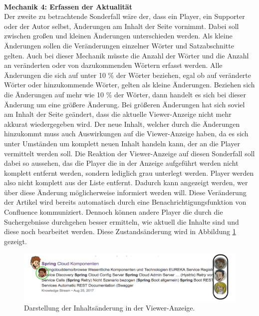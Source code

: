 \documentclass[a4paper,12pt,twoside]{scrartcl}
\begin{document}
\\
\textbf{Mechanik 4: Erfassen der Aktualität}\\
Der zweite zu betrachtende Sonderfall wäre der, dass ein Player, ein Supporter oder der Autor selbst, Änderungen am Inhalt der Seite vornimmt. Dabei soll zwischen großen und kleinen Änderungen unterschieden werden. Als kleine Änderungen sollen die Veränderungen einzelner Wörter und Satzabschnitte gelten. Auch bei dieser Mechanik müsste die Anzahl der Wörter und die Anzahl an veränderten oder von dazukommenden Wörtern erfasst werden.  Alle Änderungen die sich auf unter 10 \% der Wörter beziehen, egal ob auf veränderte Wörter oder hinzukommende Wörter, gelten als kleine Änderungen. Beziehen sich die Änderungen auf mehr wie  10 \% der Wörter, dann handelt es sich bei dieser Änderung um eine größere Änderung. Bei größeren Änderungen hat sich soviel am Inhalt der Seite geändert, dass die aktuelle Viewer-Anzeige nicht mehr akkurat wiedergegeben wird. Der neue Inhalt, welcher durch die Änderungen hinzukommt muss auch Auswirkungen auf die Viewer-Anzeige haben, da es sich unter Umständen um komplett neuen Inhalt handeln kann, der an die Player vermittelt werden soll. Die Reaktion der Viewer-Anzeige auf diesen Sonderfall soll dabei so aussehen, das die Player die in der Anzeige aufgeführt werden nicht komplett entfernt werden, sondern lediglich grau unterlegt werden. Player werden also nicht komplett aus der Liste entfernt. Dadurch kann angezeigt werden, wer über diese Änderung möglicherweise informiert werden will. Diese Veränderung der Artikel wird bereits automatisch durch eine Benachrichtigungsfunktion von Confluence kommuniziert. Dennoch können andere Player die durch die Suchergebnisse durchgehen besser ermitteln, wie aktuell die Inhalte sind und diese noch bearbeitet werden. Diese Zustandsänderung wird in Abbildung \ref{NeueSuchErgebnisseSupporterGrau} gezeigt.  
\\
\begin{figure}[h!]
\begin{center}
\includegraphics[scale = 0.5]{Bilder/NeueSuchErgebnisseSupporterGrau.png}
\caption{Darstellung der Inhaltsänderung in der Viewer-Anzeige.}
\label{NeueSuchErgebnisseSupporterGrau}
\end{center}
\end{figure} 
\end{document}
